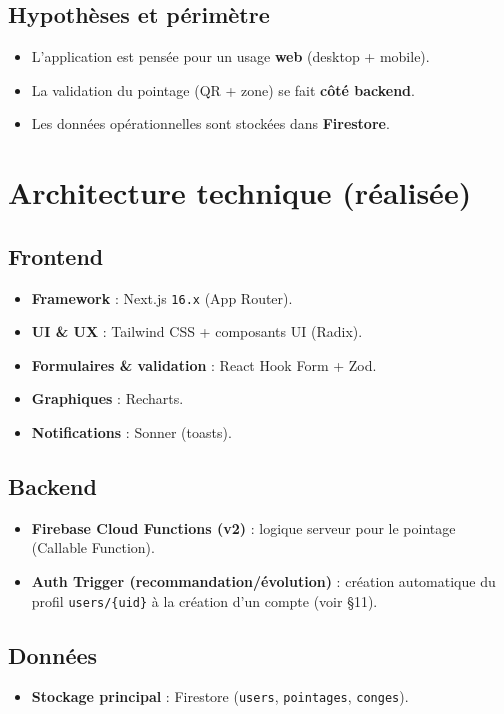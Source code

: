\documentclass[12pt,a4paper]{article}
\begin{document}
\subsection{Hypothèses et périmètre}
\begin{itemize}[leftmargin=*]
  \item L’application est pensée pour un usage \textbf{web} (desktop + mobile).
  \item La validation du pointage (QR + zone) se fait \textbf{côté backend}.
  \item Les données opérationnelles sont stockées dans \textbf{Firestore}.
\end{itemize}

\section{Architecture technique (réalisée)}
\subsection{Frontend}
\begin{itemize}[leftmargin=*]
  \item \textbf{Framework} : Next.js \texttt{16.x} (App Router).
  \item \textbf{UI \& UX} : Tailwind CSS + composants UI (Radix).
  \item \textbf{Formulaires \& validation} : React Hook Form + Zod.
  \item \textbf{Graphiques} : Recharts.
  \item \textbf{Notifications} : Sonner (toasts).
\end{itemize}

\subsection{Backend}
\begin{itemize}[leftmargin=*]
  \item \textbf{Firebase Cloud Functions (v2)} : logique serveur pour le pointage (Callable Function).
  \item \textbf{Auth Trigger (recommandation/évolution)} : création automatique du profil \texttt{users/\{uid\}} à la création d’un compte (voir \S 11).
\end{itemize}

\subsection{Données}
\begin{itemize}[leftmargin=*]
  \item \textbf{Stockage principal} : Firestore (\texttt{users}, \texttt{pointages}, \texttt{conges}).
\end{itemize}
\end{document}
